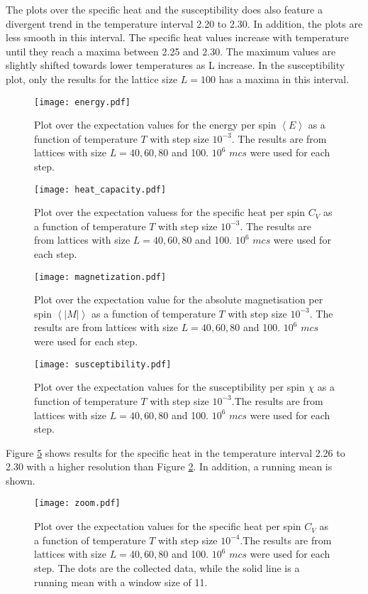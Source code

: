 The plots over the specific heat and the susceptibility does also feature a divergent trend in the temperature interval 2.20 to 2.30. In addition, the plots are less smooth in this interval. The specific heat values increase with temperature until they reach a maxima between 2.25 and 2.30. The maximum values are slightly shifted towards lower temperatures as L increase. In the susceptibility plot, only the results for the lattice size $L=100$ has a maxima in this interval.  
\begin{figure}[htbp]
	\centering
	\texttt{[image: energy.pdf]}
	\caption{Plot over the expectation values for the energy per spin $\left\langle E\right\rangle$ as a function of temperature $T$ with step size $10^{-3}$. The results are from lattices with size $L=40,60,80$ and 100.  $10^6$ $mcs$ were used for each step.}
	\label{fig:E}
\end{figure}

\begin{figure}[htbp]
	\centering
	\texttt{[image: heat\_capacity.pdf]}
	\caption{Plot over the expectation valuess for the specific heat per spin $C_V$ as a function of temperature $T$ with step size $10^{-3}$. The results are from lattices with size $L=40,60,80$ and 100. $10^6$ $mcs$ were used for each step.}
	\label{fig:C}
\end{figure}

\begin{figure}[htbp]
	\centering
	\texttt{[image: magnetization.pdf]}
	\caption{Plot over the expectation value for the absolute magnetisation per spin $\left\langle |M|\right\rangle$ as a function of temperature $T$ with step size $10^{-3}$. The results are from lattices with size $L=40,60,80$ and 100. $10^6$ $mcs$ were used for each step.}
	\label{fig:M}
\end{figure}

\begin{figure}[htbp]
	\centering
	\texttt{[image: susceptibility.pdf]}
	\caption{Plot over the expectation values for the susceptibility per spin $\chi$ as a function of temperature $T$ with step size $10^{-3}$.The results are from lattices with size $L=40,60,80$ and 100. $10^6$ $mcs$ were used for each step.}
	\label{fig:Chi}
\end{figure}

Figure \ref{fig:zoom} shows results for the specific heat in the temperature interval 2.26 to 2.30 with a higher resolution than Figure \ref{fig:C}. In addition, a running mean is shown.  
\begin{figure}[htbp]
	\centering
	\texttt{[image: zoom.pdf]}
	\caption{Plot over the expectation values for the specific heat per spin $C_V$ as a function of temperature $T$ with step size $10^{-4}$.The results are from lattices with size $L=40,60,80$ and 100. $10^6$ $mcs$ were used for each step. The dots are the collected data, while the solid line is a running mean with a window size of 11.}
	\label{fig:zoom}
\end{figure}


